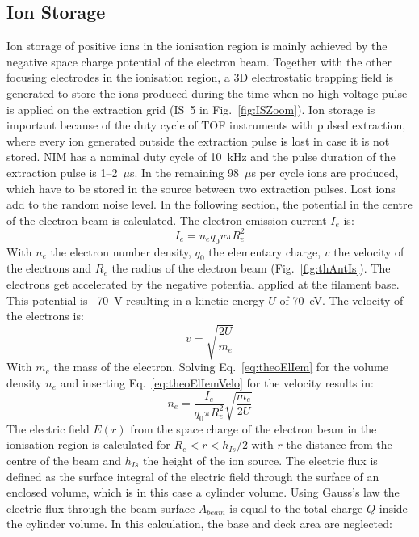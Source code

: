 	\subsection{Ion Storage}\label{chap:TheoIonStor}
	Ion storage of positive ions in the ionisation region is mainly achieved by the negative space charge potential of the electron beam. Together with the other focusing electrodes in the ionisation region, a 3D electrostatic trapping field is generated to store the ions produced during the time when no high-voltage pulse is applied on the extraction grid (IS~5 in Fig.~\ref{fig:ISZoom}). Ion storage is important because of the duty cycle of TOF instruments with pulsed extraction, where every ion generated outside the extraction pulse is lost in case it is not stored. NIM has a nominal duty cycle of 10~kHz and the pulse duration of the extraction pulse is 1--2~$\mu$s. In the remaining 98~$\mu$s per cycle ions are produced, which have to be stored in the source between two extraction pulses. Lost ions add to the random noise level. In the following section, the potential in the centre of the electron beam is calculated. The electron emission current $I_{e}$ is:
	\begin{equation}
		I_{e} = n_e q_0 v\pi R_e^2
		\label{eq:theoElIem}
	\end{equation}
	With $n_e$ the electron number density, $q_0$ the elementary charge, $v$ the velocity of the electrons and $R_e$ the radius of the electron beam (Fig.~\ref{fig:thAntIs}). The electrons get accelerated by the negative potential applied at the filament base. This potential is --70~\si{\volt} resulting in a kinetic energy $U$ of 70~\si{\electronvolt}. The velocity of the electrons is:
	\begin{equation}
		v = \sqrt{\frac{2 U}{m_e}}
		\label{eq:theoElIemVelo}
	\end{equation}
	With $m_e$ the mass of the electron. Solving Eq.~\eqref{eq:theoElIem} for the volume density $n_e$ and inserting Eq.~\eqref{eq:theoElIemVelo} for the velocity results in:
	\begin{equation}
		n_e = \frac{I_e}{q_0 \pi R_e^2}\sqrt{\frac{m_e}{2U}}
		\label{eq:theoElIemNe}
	\end{equation}
	The electric field $E(r)$ from the space charge of the electron beam in the ionisation region is calculated for $R_e<r<h_{Is}/2$ with $r$ the distance from the centre of the beam and $h_{Is}$ the height of the ion source. The electric flux is defined as the surface integral of the electric field through the surface of an enclosed volume, which is in this case a cylinder volume. Using Gauss's law the electric flux through the beam surface $A_{beam}$ is equal to the total charge $Q$ inside the cylinder volume. In this calculation, the base and deck area are neglected:
